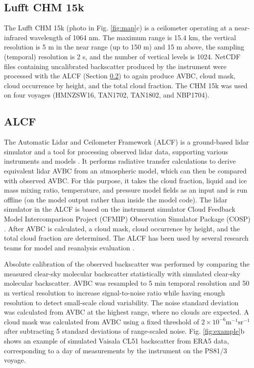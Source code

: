 \documentclass[12pt,a4paper]{article}
\begin{document}
\subsection{Lufft CHM 15k}
\label{sec:chm15k}

The Lufft CHM 15k (photo in Fig. \ref{fig:map}c) is a ceilometer operating at a
near-infrared wavelength of 1064 nm. The maximum range is 15.4 km, the vertical
resolution is 5 m in the near range (up to 150 m) and 15 m above, the sampling
(temporal) resolution is 2 s, and the number of vertical levels is 1024.
NetCDF files containing uncalibrated backscatter produced by the instrument
were processed with the ALCF (Section \ref{sec:alcf}) to again produce AVBC,
cloud mask, cloud occurrence by height, and the total cloud fraction. The CHM
15k was used on four voyages (HMNZSW16, TAN1702, TAN1802, and NBP1704).

\subsection{ALCF}
\label{sec:alcf}

The Automatic Lidar and Ceilometer Framework (ALCF) is a ground-based lidar
simulator and a tool for processing observed lidar data, supporting various
instruments and models \citep{kuma2021}. It performs radiative transfer
calculations to derive equivalent lidar AVBC from an atmospheric model, which can
then be compared with observed AVBC. For this purpose, it takes the cloud
fraction, liquid and ice mass mixing ratio, temperature, and pressure model
fields as an input and is run offline (on the model output rather than inside
the model code). The lidar simulator in the ALCF is based on the instrument
simulator Cloud Feedback Model Intercomparison Project (CFMIP) Observation
Simulator Package (COSP) \citep{bodas-salcedo2011}.  After AVBC is calculated,
a cloud mask, cloud occurrence by height, and the total cloud fraction are
determined. The ALCF has been used by several research teams for model and
reanalysis evaluation
\citep{kuma2020,kremser2021,guyot2022,pei2023,whitehead2023,mcdonald2024}.

Absolute calibration of the observed backscatter was performed by comparing the
measured clear-sky molecular backscatter statistically with simulated clear-sky
molecular backscatter. AVBC was resampled to 5 min temporal resolution and 50 m
vertical resolution to increase signal-to-noise ratio while having enough
resolution to detect small-scale cloud variability. The noise standard
deviation was calculated from AVBC at the highest range, where no clouds are
expected.  A cloud mask was calculated from AVBC using a fixed threshold of
$\mathrm{2\times 10^{-6} m^{-1}sr^{-1}}$ after subtracting 5 standard
deviations of range-scaled noise. Fig. \ref{fig:example}b shows an example of
simulated Vaisala CL51 backscatter from ERA5 data, corresponding to a day of
measurements by the instrument on the PS81/3 voyage.
\end{document}
